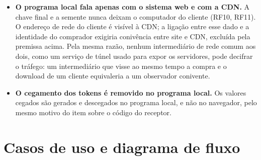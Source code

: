 \begin{itemize}
\item \textbf{O programa local fala apenas com o sistema web e com a CDN.} A
chave final e a semente nunca deixam o computador do cliente (RF10, RF11). O
endereço de rede do cliente é visível à CDN; a ligação entre esse dado e a
identidade do comprador exigiria conivência entre site e CDN, excluída pela
premissa acima. Pela mesma razão, nenhum intermediário de rede comum aos dois,
como um serviço de túnel usado para expor os servidores, pode decifrar o
tráfego: um intermediário que visse ao mesmo tempo a compra e o download de um
cliente equivaleria a um observador conivente.

\item \textbf{O cegamento dos tokens é removido no programa local.} Os valores
cegados são gerados e descegados no programa local, e não no navegador, pelo
mesmo motivo do item sobre o código do receptor.
\end{itemize}

\section{Casos de uso e diagrama de fluxo}

